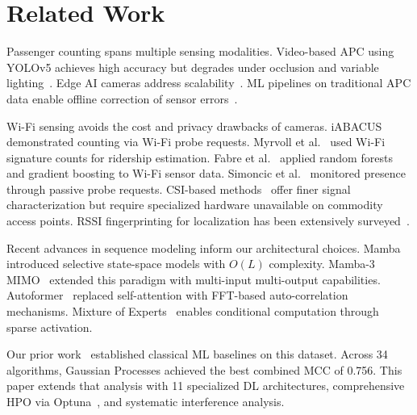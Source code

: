 \section{Related Work}

Passenger counting spans multiple sensing modalities. Video-based APC using YOLOv5 achieves high accuracy but degrades under occlusion and variable lighting~\cite{pronello2023evaluating}. Edge AI cameras address scalability~\cite{ono2025realtime}. ML pipelines on traditional APC data enable offline correction of sensor errors~\cite{wiboonsiriruk2023efficient}.

Wi-Fi sensing avoids the cost and privacy drawbacks of cameras. iABACUS~\cite{nitti2020iabacus} demonstrated counting via Wi-Fi probe requests. Myrvoll et al.~\cite{myrvoll2017counting} used Wi-Fi signature counts for ridership estimation. Fabre et al.~\cite{fabre2025machine} applied random forests and gradient boosting to Wi-Fi sensor data. Simoncic et al.~\cite{simoncic2023nonintrusive} monitored presence through passive probe requests. CSI-based methods~\cite{wang2024csi} offer finer signal characterization but require specialized hardware unavailable on commodity access points. RSSI fingerprinting for localization has been extensively surveyed~\cite{singh2021rssisurvey}.

Recent advances in sequence modeling inform our architectural choices. Mamba~\cite{gu2023mamba} introduced selective state-space models with $O(L)$ complexity. Mamba-3 MIMO~\cite{gu2026mamba3} extended this paradigm with multi-input multi-output capabilities. Autoformer~\cite{wu2021autoformer} replaced self-attention with FFT-based auto-correlation mechanisms. Mixture of Experts~\cite{shazeer2017moe} enables conditional computation through sparse activation.

Our prior work~\cite{ribeiro2026eucnc} established classical ML baselines on this dataset. Across 34 algorithms, Gaussian Processes achieved the best combined MCC of 0.756. This paper extends that analysis with 11 specialized DL architectures, comprehensive HPO via Optuna~\cite{optuna2019}, and systematic interference analysis.
